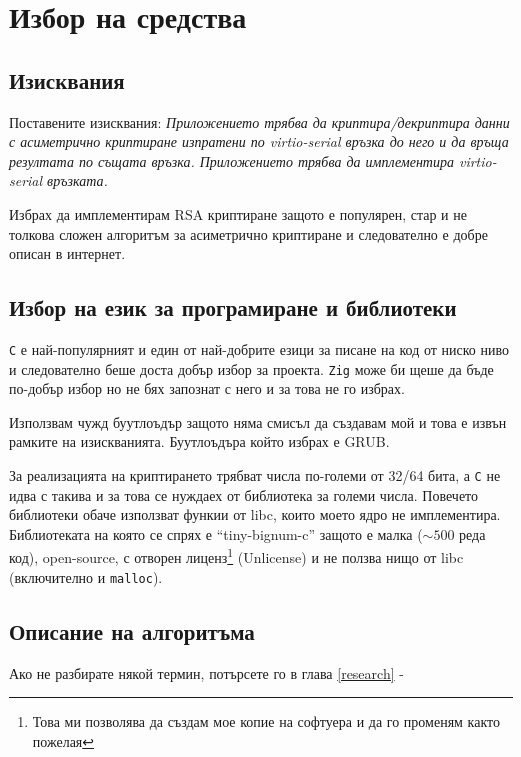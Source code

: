 \section{Избор на средства}
\subsection{Изисквания}
Поставените изисквания: \textit{Приложението трябва да криптира/декриптира данни с асиметрично криптиране изпратени по virtio-serial връзка до него и да връща резултата по същата връзка. Приложението трябва да имплементира virtio-serial връзката.}

Избрах да имплементирам RSA криптиране защото е популярен, стар и не толкова сложен алгоритъм за асиметрично криптиране и следователно е добре описан в интернет.

\subsection{Избор на език за програмиране и библиотеки} \label{langchoice}
{\tt C} е най-популярният и един от най-добрите езици за писане на код от ниско ниво и следователно беше доста добър избор за проекта. {\tt Zig} може би щеше да бъде по-добър избор но не бях запознат с него и за това не го избрах.

Използвам чужд буутлоъдър защото няма смисъл да създавам мой и това е извън рамките на изискванията. Буутлоъдъра който избрах е GRUB.

За реализацията на криптирането трябват числа по-големи от 32/64 бита, а {\tt C} не идва с такива и за това се нуждаех от библиотека за големи числа. Повечето библиотеки обаче използват функии от libc, които моето ядро не имплементира. Библиотеката на която се спрях е ``tiny-bignum-c''\parencite{tinybignumc} защото е малка ($\sim500$ реда код), open-source, с отворен лиценз\footnote{Това ми позволява да създам мое копие на софтуера и да го променям както пожелая} (Unlicense) и не ползва нищо от libc (включително и {\tt malloc}).

\subsection{Описание на алгоритъма}
Ако не разбирате някой термин, потърсете го в глава \ref{research} - 
